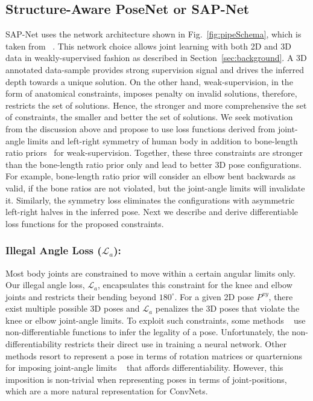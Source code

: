 \documentclass[runningheads]{llncs}
\begin{document}
\subsection{Structure-Aware PoseNet or SAP-Net}
SAP-Net uses the network architecture shown in Fig.~\ref{fig:pipeSchema}, which is taken from ~\cite{Zhou_2017_ICCV}. This network choice allows joint learning with both 2D and 3D data in weakly-supervised fashion as described in Section~\ref{sec:background}. A 3D annotated data-sample provides strong supervision signal and drives the inferred depth towards a unique solution. On the other hand, weak-supervision, in the form of anatomical constraints, imposes penalty on invalid solutions, therefore, restricts the set of solutions. Hence, the stronger and more comprehensive the set of constraints, the smaller and better the set of solutions. We seek motivation from the discussion above and propose to use loss functions derived from joint-angle limits and left-right symmetry of human body in addition to bone-length ratio priors~\cite{Zhou_2017_ICCV} for weak-supervision. Together, these three constraints are stronger than the bone-length ratio prior only and lead to better 3D pose configurations. For example, bone-length ratio prior will consider an elbow bent backwards as valid, if the bone ratios are not violated, but the joint-angle limits will invalidate it. Similarly, the symmetry loss eliminates the configurations with asymmetric left-right halves in the inferred pose. Next we describe and derive differentiable loss functions for the proposed constraints. 

\vspace{-1em}
\subsubsection{Illegal Angle Loss ($\mathcal{L}_a$):} Most body joints are constrained to move within a certain angular limits only. Our illegal angle loss,  $\mathcal{L}_a$, encapsulates this constraint for the knee and elbow joints and restricts their bending beyond $180^{\circ}$. For a given 2D pose $P^{xy}$, there exist multiple possible 3D poses and $\mathcal{L}_a$ penalizes the 3D poses that violate the knee or elbow joint-angle limits. To exploit such constraints, some methods ~\cite{HERDA2005189,akhter2015pose,ChenNie2013TIP} use non-differentiable functions to infer the legality of a pose. Unfortunately, the non-differentiability restricts their direct use in training a neural network. 
Other methods resort to represent a pose in terms of rotation matrices or quarternions for imposing joint-angle limits ~\cite{akhter2015pose,Wei:2010} that affords differentiability. However, this imposition is non-trivial when representing poses in terms of joint-positions, which are a more natural representation for ConvNets. 
\end{document}
